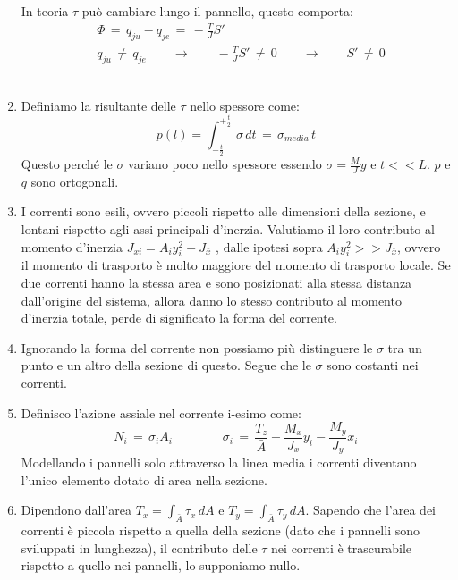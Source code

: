 \begin{enumerate}
    In teoria $\tau$ può cambiare lungo il pannello, questo comporta:
    \begin{align*}
        &\Phi\, = \, q_{ju} -q_{je}\,=\, -\frac{T}{J}S'\\
        &q_{ju} \,\neq\, q_{je}  \quad \quad \rightarrow  \quad \quad  -\frac{T}{J}S'\,\neq\, 0 \quad \quad \rightarrow  \quad \quad S'\,\neq\, 0
    \end{align*}\\
    \item Definiamo la risultante delle $\tau$ nello spessore come:
    \begin{equation*}
        p(l) = \int_{-\frac{t}{2}}^{+\frac{t}{2}} \, \sigma \,dt\,= \, \sigma_{media} \,t
    \end{equation*}
    Questo perché le $\sigma$ variano poco nello spessore essendo $\sigma = \frac{M}{J}y$ e $t<<L$.
    $p$ e $q$ sono ortogonali.\\
    \item I correnti sono esili, ovvero piccoli rispetto alle dimensioni della sezione, e lontani rispetto agli assi principali d'inerzia. Valutiamo  il loro contributo al momento d'inerzia $J_{xi}= A_iy_i^2 + J_{\bar{x}}$ , dalle ipotesi sopra $A_iy_i^2 >> J_{\bar{x}}$, ovvero il momento di trasporto è molto maggiore del momento di trasporto locale. Se due correnti hanno la stessa area e sono posizionati alla stessa distanza dall'origine del sistema, allora danno lo stesso contributo al momento d'inerzia totale, perde di significato la forma del corrente.\\
    \item Ignorando la forma del corrente non possiamo più distinguere le $\sigma$ tra un punto e un altro della sezione di questo. Segue che le $\sigma$ sono costanti nei correnti.\\
    \item Definisco l'azione assiale nel corrente i-esimo come:
    \begin{equation*}
        N_i \,=\, \sigma_i A_i
        \quad  \quad  \quad  \quad
        \sigma_i\,=\,
         \frac{T_z}{ \bar{A}} 
        + \frac{M_x}{ J_x} y_i
        - \frac{M_y}{ J_y} x_i
    \end{equation*}
    Modellando i pannelli solo attraverso la linea media i correnti diventano l'unico elemento dotato di area nella sezione.   \\
    \item Dipendono dall'area $T_x = \int_{\bar{A}}\tau_x\,dA$ e  $T_y = \int_{\bar{A}}\tau_y\,dA$. Sapendo che l'area dei correnti è piccola rispetto a quella della sezione (dato che i pannelli sono sviluppati in lunghezza), il contributo delle $\tau$ nei correnti è trascurabile rispetto a quello nei pannelli, lo supponiamo nullo.
    
    
    
\end{enumerate}







